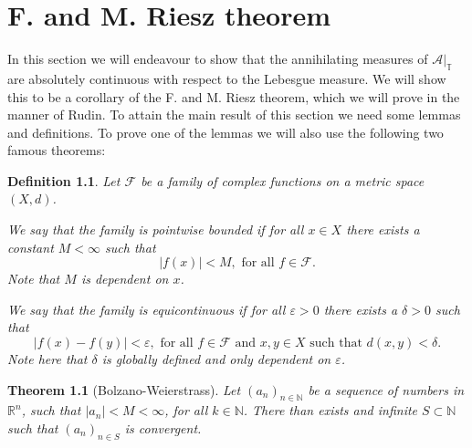 \documentclass[a4paper,12pt,twoside,BCOR=10mm]{scrbook}
\newtheorem{theorem}{Theorem}
\newtheorem{definition}{Definition}
\begin{document}
\chapter{F. and M. Riesz theorem}
In this section we will endeavour to show that the annihilating measures of $\mathcal{A}|_{\mathbb{T}}$ are absolutely continuous with respect to the Lebesgue measure.
We will show this to be a corollary of the F. and M. Riesz theorem, which we will prove in the manner of Rudin. %
To attain the main result of this section we need some lemmas and definitions. %
To prove one of the lemmas we will also use the following two famous theorems:
\begin{definition}
Let $\mathcal{F}$ be a family of complex functions on a metric space $(X, d)$.

We say that the family is \emph{pointwise bounded} if for all $x \in X$ there exists a constant $M < \infty$ such that
\[
	|f(x)| < M,\text{ for all } f \in \mathcal{F}.
\]
Note that $M$ is dependent on $x$.

We say that the family is \emph{equicontinuous} if for all $\varepsilon > 0$ there exists a $\delta > 0$ such that
\[
	|f(x) - f(y)| < \varepsilon,\text{ for all } f \in \mathcal{F}\text{ and } x, y \in X\text{ such that } d(x, y) < \delta.
\]
Note here that $\delta$ is globally defined and only dependent on $\varepsilon$.
\end{definition}
\begin{theorem}[Bolzano-Weierstrass]
Let $(a_n)_{n \in \mathbb{N}}$ be a sequence of numbers in $\mathbb{R}^n$, such that $|a_n| < M < \infty$, for all $k \in \mathbb{N}$.
There than exists and infinite $S \subset \mathbb{N}$ such that $(a_n)_{n \in S}$ is convergent.
\end{theorem}
\end{document}
